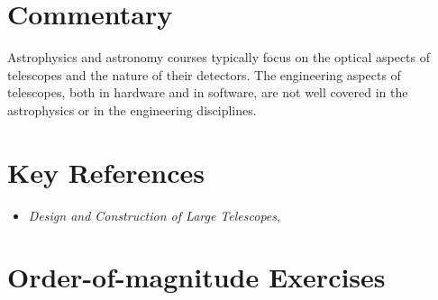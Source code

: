 \section{Commentary}

Astrophysics and astronomy courses typically focus on the optical
aspects of telescopes and the nature of their detectors.  The
engineering aspects of telescopes, both in hardware and in software,
are not well covered in the astrophysics or in the engineering
disciplines.

\section{Key References}

\begin{itemize}
  \item
    {\it Design and Construction of Large Telescopes},
      \citet{bely03a}
\end{itemize}

\section{Order-of-magnitude Exercises}

